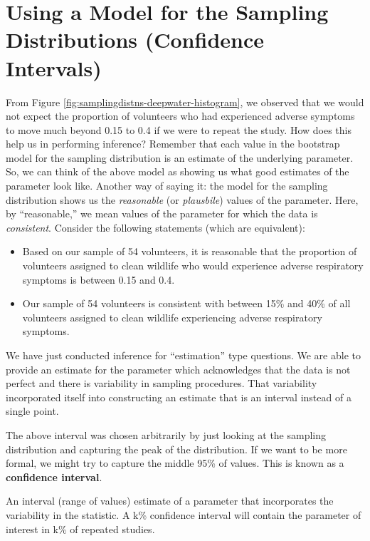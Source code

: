 \documentclass[]{book}
\providecommand{\tightlist}{%
  \setlength{\itemsep}{0pt}\setlength{\parskip}{0pt}}
\theoremstyle{definition}
\theoremstyle{definition}
\theoremstyle{definition}
\theoremstyle{remark}
\let\BeginKnitrBlock\begin \let\EndKnitrBlock\end
\begin{document}
\section{Using a Model for the Sampling Distributions (Confidence
Intervals)}\label{using-a-model-for-the-sampling-distributions-confidence-intervals}

From Figure \ref{fig:samplingdistns-deepwater-histogram}, we observed
that we would not expect the proportion of volunteers who had
experienced adverse symptoms to move much beyond 0.15 to 0.4 if we were
to repeat the study. How does this help us in performing inference?
Remember that each value in the bootstrap model for the sampling
distribution is an estimate of the underlying parameter. So, we can
think of the above model as showing us what good estimates of the
parameter look like. Another way of saying it: the model for the
sampling distribution shows us the \emph{reasonable} (or
\emph{plausbile}) values of the parameter. Here, by ``reasonable,'' we
mean values of the parameter for which the data is \emph{consistent}.
Consider the following statements (which are equivalent):

\begin{itemize}
\tightlist
\item
  Based on our sample of 54 volunteers, it is reasonable that the
  proportion of volunteers assigned to clean wildlife who would
  experience adverse respiratory symptoms is between 0.15 and 0.4.
\item
  Our sample of 54 volunteers is consistent with between 15\% and 40\%
  of all volunteers assigned to clean wildlife experiencing adverse
  respiratory symptoms.
\end{itemize}

We have just conducted inference for ``estimation'' type questions. We
are able to provide an estimate for the parameter which acknowledges
that the data is not perfect and there is variability in sampling
procedures. That variability incorporated itself into constructing an
estimate that is an interval instead of a single point.

The above interval was chosen arbitrarily by just looking at the
sampling distribution and capturing the peak of the distribution. If we
want to be more formal, we might try to capture the middle 95\% of
values. This is known as a \textbf{confidence interval}.

\BeginKnitrBlock{definition}[Confidence Interval]
\protect\hypertarget{def:defn-confidence-interval}{}{\label{def:defn-confidence-interval}
{} }An interval (range of values)
estimate of a parameter that incorporates the variability in the
statistic. A k\% confidence interval will contain the parameter of
interest in k\% of repeated studies.
\EndKnitrBlock{definition}
\end{document}
